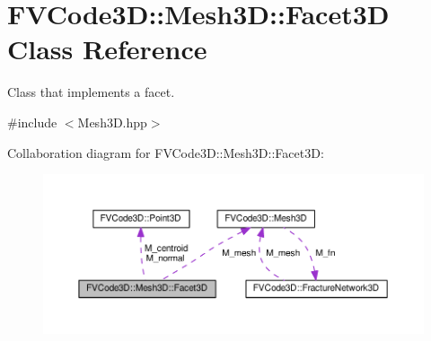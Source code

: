 \hypertarget{classFVCode3D_1_1Mesh3D_1_1Facet3D}{}\section{F\+V\+Code3D\+:\+:Mesh3D\+:\+:Facet3D Class Reference}
\label{classFVCode3D_1_1Mesh3D_1_1Facet3D}


Class that implements a facet.  




{\ttfamily \#include $<$Mesh3\+D.\+hpp$>$}



Collaboration diagram for F\+V\+Code3D\+:\+:Mesh3D\+:\+:Facet3D\+:
\nopagebreak
\begin{figure}[H]
\begin{center}
\leavevmode
\includegraphics[width=350pt]{classFVCode3D_1_1Mesh3D_1_1Facet3D__coll__graph}
\end{center}
\end{figure}
